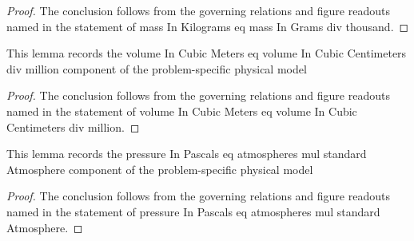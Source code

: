 \begin{proof}
  The conclusion follows from the governing relations and figure readouts named in the statement of mass In Kilograms eq mass In Grams div thousand.
\end{proof}
\begin{lemma}
  \label{lem:physics:phyx-mini-0406:phyxminiproblems-problemphyxmini0406-volumeincubicmeters-eq-volumeincubiccentimeters-div-million}
  This lemma records the volume In Cubic Meters eq volume In Cubic Centimeters div million component of the problem-specific physical model
\end{lemma}
\begin{proof}
  The conclusion follows from the governing relations and figure readouts named in the statement of volume In Cubic Meters eq volume In Cubic Centimeters div million.
\end{proof}
\begin{lemma}
  \label{lem:physics:phyx-mini-0406:phyxminiproblems-problemphyxmini0406-pressureinpascals-eq-atmospheres-mul-standardatmosphere}
  This lemma records the pressure In Pascals eq atmospheres mul standard Atmosphere component of the problem-specific physical model
\end{lemma}
\begin{proof}
  The conclusion follows from the governing relations and figure readouts named in the statement of pressure In Pascals eq atmospheres mul standard Atmosphere.
\end{proof}
